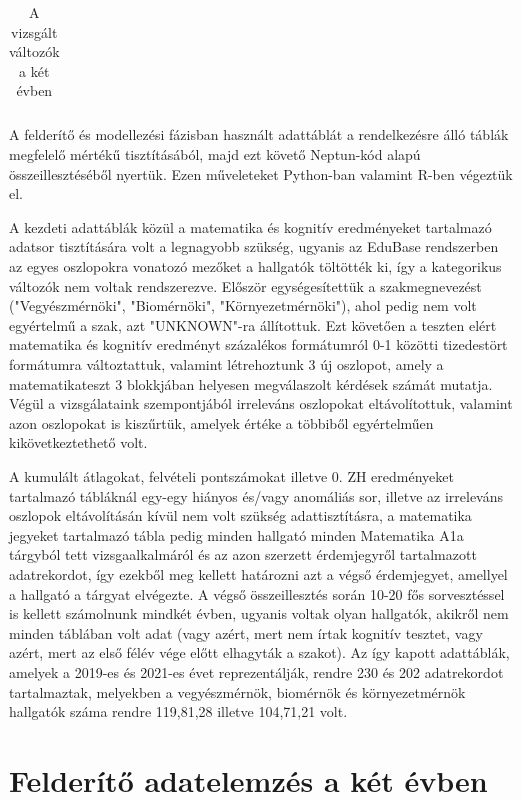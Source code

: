 \documentclass[12pt]{article}
\begin{document}
\begin{table}[H]
\begin{tabular}{|c|c|}
\end{tabular}
\caption{A vizsgált változók a két évben}
\label{tab:valtozok}
\end{table}

A felderítő és modellezési fázisban használt adattáblát a rendelkezésre álló táblák megfelelő mértékű tisztításából, majd ezt követő Neptun-kód alapú összeillesztéséből nyertük. Ezen műveleteket Python-ban valamint R-ben végeztük el.

A kezdeti adattáblák közül a matematika és kognitív eredményeket tartalmazó adatsor tisztítására volt a legnagyobb szükség, ugyanis az EduBase rendszerben az egyes oszlopokra vonatozó mezőket a hallgatók töltötték ki, így a kategorikus változók nem voltak rendszerezve. Először egységesítettük a szakmegnevezést ("Vegyészmérnöki", "Biomérnöki", "Környezetmérnöki"), ahol pedig nem volt egyértelmű a szak, azt "UNKNOWN"-ra állítottuk. Ezt követően a teszten elért matematika és kognitív eredményt százalékos formátumról 0-1 közötti tizedestört formátumra változtattuk, valamint létrehoztunk 3 új oszlopot, amely a matematikateszt 3 blokkjában helyesen megválaszolt kérdések számát mutatja. Végül a vizsgálataink szempontjából irreleváns oszlopokat eltávolítottuk, valamint azon oszlopokat is kiszűrtük, amelyek értéke a többiből egyértelműen kikövetkeztethető volt. 

A kumulált átlagokat, felvételi pontszámokat illetve 0. ZH eredményeket tartalmazó tábláknál egy-egy hiányos és/vagy anomáliás sor, illetve az irreleváns oszlopok eltávolításán kívül nem volt szükség adattisztításra, a matematika jegyeket tartalmazó tábla pedig minden hallgató minden Matematika A1a tárgyból tett vizsgaalkalmáról és az azon szerzett érdemjegyről tartalmazott adatrekordot, így ezekből meg kellett határozni azt a végső érdemjegyet, amellyel a hallgató a tárgyat elvégezte. A végső összeillesztés során 10-20 fős sorvesztéssel is kellett számolnunk mindkét évben, ugyanis voltak olyan hallgatók, akikről nem minden táblában volt adat (vagy azért, mert nem írtak kognitív tesztet, vagy azért, mert az első félév vége előtt elhagyták a szakot). Az így kapott adattáblák, amelyek a 2019-es és 2021-es évet reprezentálják, rendre 230 és 202 adatrekordot tartalmaztak, melyekben a vegyészmérnök, biomérnök és környezetmérnök hallgatók száma rendre 119,81,28 illetve 104,71,21 volt.

\newpage

\section{Felderítő adatelemzés a két évben}
\end{document}
